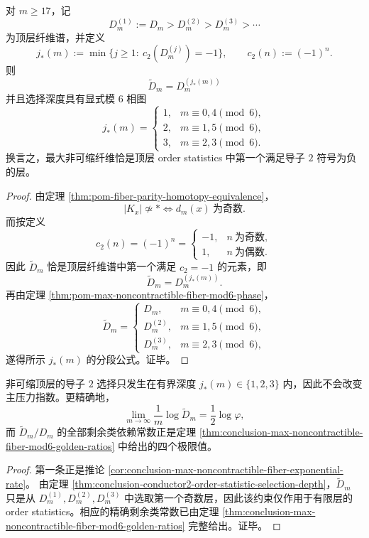 \begin{theorem}\label{thm:conclusion-conductor2-order-statistic-selection-depth}
对 \(m\ge 17\)，记
\[
D_m^{(1)}:=D_m>D_m^{(2)}>D_m^{(3)}>\cdots
\]
为顶层纤维谱，并定义
\[
j_\ast(m):=\min\{j\ge 1:\ c_2(D_m^{(j)})=-1\},
\qquad
c_2(n):=(-1)^n.
\]
则
\[
\widetilde D_m=D_m^{(j_\ast(m))}
\]
并且选择深度具有显式模 \(6\) 相图
\[
j_\ast(m)=
\begin{cases}
1,& m\equiv 0,4\pmod 6,\\
2,& m\equiv 1,5\pmod 6,\\
3,& m\equiv 2,3\pmod 6.
\end{cases}
\]
换言之，最大非可缩纤维恰是顶层 order statistics 中第一个满足导子 \(2\) 符号为负的层。
\end{theorem}
\begin{proof}
由定理 \ref{thm:pom-fiber-parity-homotopy-equivalence}，
\[
|K_x|\not\simeq *
\Longleftrightarrow
d_m(x)\ \text{为奇数}.
\]
而按定义
\[
c_2(n)=(-1)^n=
\begin{cases}
-1,& n\ \text{为奇数},\\
1,& n\ \text{为偶数}.
\end{cases}
\]
因此 \(\widetilde D_m\) 恰是顶层纤维谱中第一个满足 \(c_2=-1\) 的元素，即
\[
\widetilde D_m=D_m^{(j_\ast(m))}.
\]
再由定理 \ref{thm:pom-max-noncontractible-fiber-mod6-phase}，
\[
\widetilde D_m=
\begin{cases}
D_m,& m\equiv 0,4\pmod 6,\\
D_m^{(2)},& m\equiv 1,5\pmod 6,\\
D_m^{(3)},& m\equiv 2,3\pmod 6,
\end{cases}
\]
遂得所示 \(j_\ast(m)\) 的分段公式。证毕。
\end{proof}

\begin{corollary}\label{cor:conclusion-conductor2-prefactor-not-exponent}
非可缩顶层的导子 \(2\) 选择只发生在有界深度 \(j_\ast(m)\in\{1,2,3\}\) 内，因此不会改变主压力指数。更精确地，
\[
\lim_{m\to\infty}\frac{1}{m}\log \widetilde D_m
=
\frac12\log\varphi,
\]
而 \(\widetilde D_m/D_m\) 的全部剩余类依赖常数正是定理 \ref{thm:conclusion-max-noncontractible-fiber-mod6-golden-ratios} 中给出的四个极限值。
\end{corollary}
\begin{proof}
第一条正是推论 \ref{cor:conclusion-max-noncontractible-fiber-exponential-rate}。
由定理 \ref{thm:conclusion-conductor2-order-statistic-selection-depth}，\(\widetilde D_m\) 只是从 \(D_m^{(1)},D_m^{(2)},D_m^{(3)}\) 中选取第一个奇数层，因此该约束仅作用于有限层的 order statistics。相应的精确剩余类常数已由定理 \ref{thm:conclusion-max-noncontractible-fiber-mod6-golden-ratios} 完整给出。证毕。
\end{proof}

